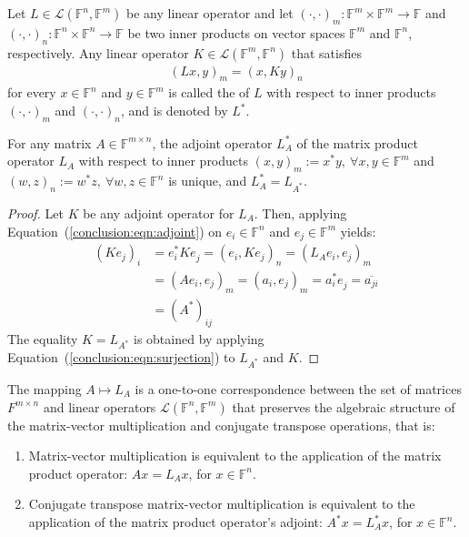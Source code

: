 \begin{definition}
Let $L \in \mathcal{L}(\mathbb{F}^n, \mathbb{F}^m)$ be any linear operator and
let $(\cdot, \cdot)_m : \mathbb{F}^m \times \mathbb{F}^m \rightarrow
\mathbb{F}$ and $(\cdot, \cdot)_n : \mathbb{F}^n \times \mathbb{F}^n
\rightarrow \mathbb{F}$ be two inner products on vector spaces $\mathbb{F}^m$
and $\mathbb{F}^n$, respectively. Any linear operator $K \in
\mathcal{L}(\mathbb{F}^m, \mathbb{F}^n)$ that satisfies
\begin{align}
    (Lx, y)_m = (x, Ky)_n \label{conclusion:eqn:adjoint}
\end{align}
for every $x \in \mathbb{F}^n$ and $y \in \mathbb{F}^m$ is called the
 of $L$ with respect to inner products $(\cdot,
\cdot)_m$ and $(\cdot, \cdot)_n$, and is denoted by $L^*$.
\end{definition}

\begin{theorem}
\label{conclusion:thm:adjoint}
For any matrix $A \in \mathbb{F}^{m \times n}$, the adjoint operator $L_A^*$ of
the matrix product operator $L_A$ with respect to inner products $(x, y)_m :=
x^*y, \ \forall x,y \in \mathbb{F}^m$ and $(w, z)_n := w^*z, \ \forall w, z \in
\mathbb{F}^n$ is unique, and $L_A^* = L_{A^*}^{}$.
\end{theorem}

\begin{proof}
Let $K$ be any adjoint operator for $L_A$. Then, applying
Equation~(\ref{conclusion:eqn:adjoint}) on $e_i \in \mathbb{F}^n$ and $e_j \in
\mathbb{F}^m$ yields:
\begin{align}
    (Ke_j)_i &= e_i^*Ke_j^{} = (e_i, Ke_j)_n = (L_Ae_i, e_j)_m \nonumber \\
             &= (Ae_i,  e_j)_m = (a_i, e_j)_m =a_i^*e_j^{} = \overline{a_{ji}}
             \\
             &= (A^*)_{ij} \nonumber
\end{align}
The equality $K = L_{A^*}$ is obtained by applying
Equation~(\ref{conclusion:eqn:surjection}) to $L_{A^*}$ and $K$.
\end{proof}

\begin{corollary}
The mapping $A \mapsto L_A$ is a one-to-one correspondence between the set of
matrices $F^{m \times n}$ and linear operators $\mathcal{L}(\mathbb{F}^n,
\mathbb{F}^m)$ that preserves the algebraic structure of the matrix-vector
multiplication and conjugate transpose operations, that is:
\begin{enumerate}
\item Matrix-vector multiplication is equivalent to the application of the
matrix product operator: $Ax = L_Ax$, for $x \in \mathbb{F}^n$.
\item Conjugate transpose matrix-vector multiplication is equivalent to the
application of the matrix product operator's adjoint: $A^*x = L_A^*x$, for $x
\in \mathbb{F}^n$.
\end{enumerate}
\end{corollary}

